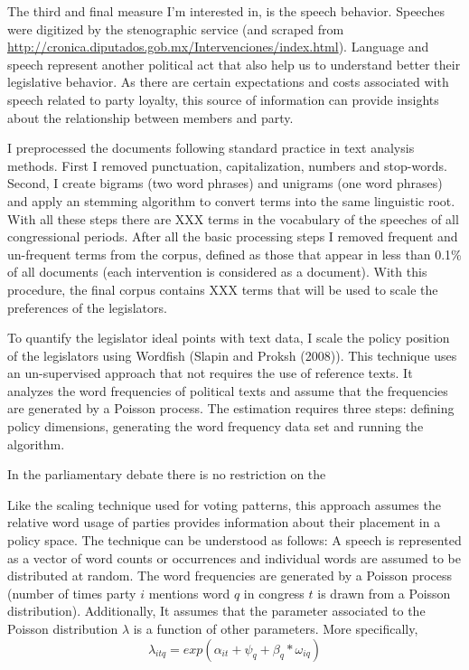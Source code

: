 \documentclass{article}
\begin{document}
The third and final measure I'm interested in, is the speech behavior.  Speeches were digitized by the stenographic service (and scraped from \url{http://cronica.diputados.gob.mx/Intervenciones/index.html}).  Language and speech represent another political act that also help us to understand better their legislative behavior. As there are certain expectations and costs associated with speech related to party loyalty, this source of information can provide insights about the relationship between members and party. 

I preprocessed the documents following standard practice in text analysis methods. First I removed punctuation, capitalization, numbers and stop-words. Second, I create bigrams (two word phrases) and unigrams (one word phrases) and apply an stemming algorithm to convert terms into the same linguistic root. With all these steps there are XXX terms in the vocabulary of the speeches of all congressional periods. After all the basic processing steps I removed frequent and un-frequent terms from the corpus, defined as those that appear in less than 0.1\% of all documents (each intervention is considered as a document). With this procedure, the final corpus contains XXX terms that will be used to scale the preferences of the legislators. 

To quantify the legislator ideal points with text data, I scale the policy position of the legislators using  Wordfish (Slapin and Proksh (2008)). This technique uses an un-supervised approach that not requires the use of reference texts. It analyzes the word frequencies of political texts and assume that the frequencies are generated by a Poisson process. The estimation requires three steps: defining policy dimensions, generating the word frequency data set and running the algorithm. 

In the parliamentary debate there is no restriction on the

Like the scaling technique used for voting patterns, this approach assumes the relative word usage of parties provides information about their placement in a policy space. The technique can be understood as follows: A speech is represented as a vector of word counts or occurrences and individual words are assumed to be distributed at random. The word frequencies are generated by a Poisson process (number of times party $i$ mentions word $q$ in congress $t$ is drawn from a Poisson distribution). Additionally, It assumes that the parameter associated to the Poisson distribution $\lambda$ is a function of other parameters. More specifically, 
\begin{equation}
\lambda_{itq} = exp(\alpha_{it} + \psi_q + \beta_q * \omega_{iq})
\end{equation}
\end{document}

